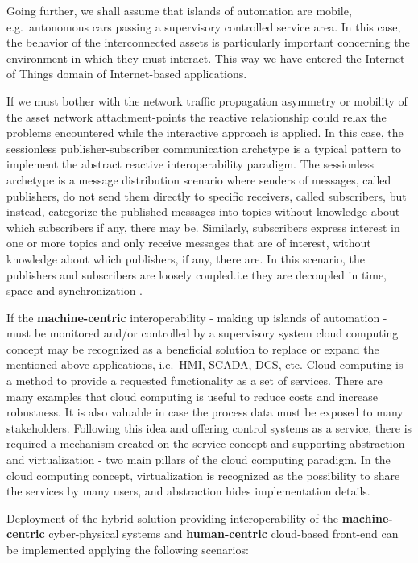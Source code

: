 \documentclass{jacsart}
\begin{document}
Going further, we shall assume that islands of automation are mobile,
e.g.~autonomous cars passing a supervisory controlled service area. In
this case, the behavior of the interconnected assets is particularly
important concerning the environment in which they must interact. This
way we have entered the Internet of Things domain of Internet-based
applications.

If we must bother with the network traffic propagation asymmetry or
mobility of the asset network attachment-points the reactive
relationship could relax the problems encountered while the interactive
approach is applied. In this case, the sessionless publisher-subscriber
communication archetype is a typical pattern to implement the abstract
reactive interoperability paradigm. The sessionless archetype is a
message distribution scenario where senders of messages, called
publishers, do not send them directly to specific receivers, called
subscribers, but instead, categorize the published messages into topics
without knowledge about which subscribers if any, there may be.
Similarly, subscribers express interest in one or more topics and only
receive messages that are of interest, without knowledge about which
publishers, if any, there are. In this scenario, the publishers and
subscribers are loosely coupled.i.e they are decoupled in time, space
and synchronization \cite{RefWorks:doc:5c44e246e4b0591b15ea9e59}.

If the \textbf{machine-centric} interoperability - making up islands of
automation - must be monitored and/or controlled by a supervisory system
cloud computing concept may be recognized as a beneficial solution to
replace or expand the mentioned above applications, i.e.~HMI, SCADA,
DCS, etc. Cloud computing is a method to provide a requested
functionality as a set of services. There are many examples that cloud
computing is useful to reduce costs and increase robustness. It is also
valuable in case the process data must be exposed to many stakeholders.
Following this idea and offering control systems as a service, there is
required a mechanism created on the service concept and supporting
abstraction and virtualization - two main pillars of the cloud computing
paradigm. In the cloud computing concept, virtualization is recognized
as the possibility to share the services by many users, and abstraction
hides implementation details.

Deployment of the hybrid solution providing interoperability of the
\textbf{machine-centric} cyber-physical systems and
\textbf{human-centric} cloud-based front-end can be implemented applying
the following scenarios:
\end{document}
